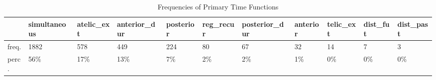 \begin{table}[htbp!]
\centering
\caption{Frequencies of Primary Time Functions}
\label{table:funct_counts}
\begin{adjustbox}{width=1\textwidth}
\begin{tabular}{lllllllllll}
\toprule
{} & simultaneous & atelic\_ext & anterior\_dur & posterior & reg\_recur & posterior\_dur & anterior & telic\_ext & dist\_fut & dist\_past \\
\midrule
freq. &         1882 &        578 &          449 &       224 &        80 &            67 &       32 &        14 &        7 &         3 \\
perc. &          56\% &        17\% &          13\% &        7\% &        2\% &            2\% &       1\% &        0\% &       0\% &        0\% \\
\bottomrule
\end{tabular}
\end{adjustbox}
\end{table}
